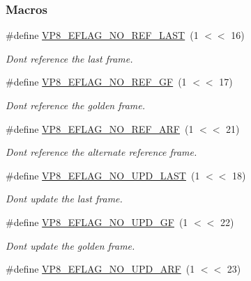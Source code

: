 \subsubsection*{Macros}
\begin{DoxyCompactItemize}
\item 
\#define \hyperlink{group__vp8__encoder_gafb51c67e5743275146bc1fc425727da3}{V\+P8\+\_\+\+E\+F\+L\+A\+G\+\_\+\+N\+O\+\_\+\+R\+E\+F\+\_\+\+L\+A\+ST}~(1 $<$$<$ 16)
\begin{DoxyCompactList}\small\item\em Don\textquotesingle{}t reference the last frame. \end{DoxyCompactList}\item 
\#define \hyperlink{group__vp8__encoder_gabb5e95343a2738abef44eca13059da33}{V\+P8\+\_\+\+E\+F\+L\+A\+G\+\_\+\+N\+O\+\_\+\+R\+E\+F\+\_\+\+GF}~(1 $<$$<$ 17)
\begin{DoxyCompactList}\small\item\em Don\textquotesingle{}t reference the golden frame. \end{DoxyCompactList}\item 
\#define \hyperlink{group__vp8__encoder_ga650ab0baea12be91082226a5cc18776a}{V\+P8\+\_\+\+E\+F\+L\+A\+G\+\_\+\+N\+O\+\_\+\+R\+E\+F\+\_\+\+A\+RF}~(1 $<$$<$ 21)
\begin{DoxyCompactList}\small\item\em Don\textquotesingle{}t reference the alternate reference frame. \end{DoxyCompactList}\item 
\#define \hyperlink{group__vp8__encoder_ga602edb6b02a89cb2db7a16d6dffba583}{V\+P8\+\_\+\+E\+F\+L\+A\+G\+\_\+\+N\+O\+\_\+\+U\+P\+D\+\_\+\+L\+A\+ST}~(1 $<$$<$ 18)
\begin{DoxyCompactList}\small\item\em Don\textquotesingle{}t update the last frame. \end{DoxyCompactList}\item 
\#define \hyperlink{group__vp8__encoder_gab01d066c5236457d345ce1cab4c41d6b}{V\+P8\+\_\+\+E\+F\+L\+A\+G\+\_\+\+N\+O\+\_\+\+U\+P\+D\+\_\+\+GF}~(1 $<$$<$ 22)
\begin{DoxyCompactList}\small\item\em Don\textquotesingle{}t update the golden frame. \end{DoxyCompactList}\item 
\#define \hyperlink{group__vp8__encoder_ga1cff46a5287e73a620660030d40b9e6c}{V\+P8\+\_\+\+E\+F\+L\+A\+G\+\_\+\+N\+O\+\_\+\+U\+P\+D\+\_\+\+A\+RF}~(1 $<$$<$ 23)

\end{DoxyCompactItemize}
